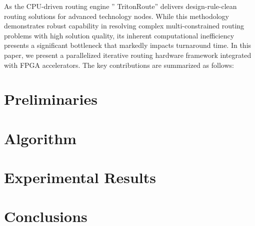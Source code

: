 \documentclass[sigconf]{acmart}
\begin{document}
As the CPU-driven routing engine '' TritonRoute'' delivers design-rule-clean routing solutions for advanced technology nodes.  While this methodology demonstrates robust capability in resolving complex multi-constrained routing problems with high solution quality, its inherent computational inefficiency presents a significant bottleneck that markedly impacts turnaround time. In this paper, we present a parallelized iterative routing hardware framework integrated with FPGA accelerators. The key contributions are summarized as follows:
\section{Preliminaries}\label{sec:problem_statement}



\section{Algorithm} \label{sec:algorithm}





\section{Experimental Results} \label{sec:experimental results}





\section{Conclusions} \label{sec:conclusion}








\tiny


%
\end{document}

